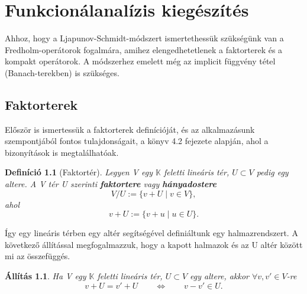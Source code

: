 \documentclass[oneside, titlepage, 12pt, a4paper]{report}
\newtheorem{definition}{Definíció}[section]
\newtheorem{statement}{Állítás}[section]
\begin{document}


\onehalfspacing
\chapter{Funkcionálanalízis kiegészítés}	%
\label{chap:Funcanal_ext}

Ahhoz, hogy a Ljapunov-Schmidt-módszert ismertethessük szükségünk van a Fredholm-operátorok fogalmára, amihez elengedhetetlenek a faktorterek és a kompakt operátorok. A módszerhez emelett még az implicit függvény tétel (Banach-terekben) is szükséges.


%
\section{Faktorterek}
\label{sec:Faktorter}

Először is ismertessük a faktorterek definícióját, és az alkalmazásunk szempontjából fontos tulajdonságait, a \cite{faktorter} könyv 4.2 fejezete alapján, ahol a bizonyítások is megtalálhatóak.
\begin{definition}[Faktortér]
Legyen V egy $\mathbb{K}$ feletti lineáris tér, $U \subset V$ pedig egy altere. A V tér U szerinti \textbf{faktortere} vagy \textbf{hányadostere}
\begin{equation}
V / U := \{v + U \mid v \in V\},
\end{equation}
ahol
\begin{equation}
v + U := \{v + u \mid u \in U \}.
\end{equation}
\end{definition}

Így egy lineáris térben egy altér segítségével definiáltunk egy halmazrendszert. A következő állítással megfogalmazzuk, hogy a kapott halmazok és az U altér között mi az összefüggés.
\begin{statement}
Ha V egy $\mathbb{K}$ feletti lineáris tér, $U \subset V$ egy altere, akkor $\forall v, v' \in V$-re
\begin{equation}
v + U = v' + U \qquad \Leftrightarrow \qquad v - v' \in U.
\end{equation}
\end{statement}
\end{document}
